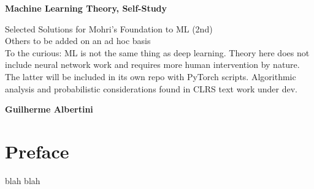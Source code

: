 \documentclass[titlepage]{book}
\begin{document}
\begin{titlepage}
    \begin{center}
        \vspace*{1cm}
            
        \Huge
        \textbf{Machine Learning Theory, Self-Study}
            
        \vspace{0.5cm}
        \LARGE
        Selected Solutions for Mohri's Foundation to ML (2nd)\\
		Others to be added on an ad hoc basis\\
		To the curious: ML is not the same thing as deep learning. Theory here does not include neural network work and requires more human intervention by nature. The latter will be included in its own repo with PyTorch scripts. Algorithmic analysis and probabilistic considerations found in CLRS text work under dev.
            
        \vspace{1.5cm}
            
        \textbf{Guilherme Albertini}
            
        \vfill
            
            
        \vspace{0.8cm}
            

        \Large
        
            
    \end{center}
\end{titlepage}

\frontmatter
\tableofcontents

\chapter*{Preface}

\TODO blah blah

\mainmatter


\end{document}
